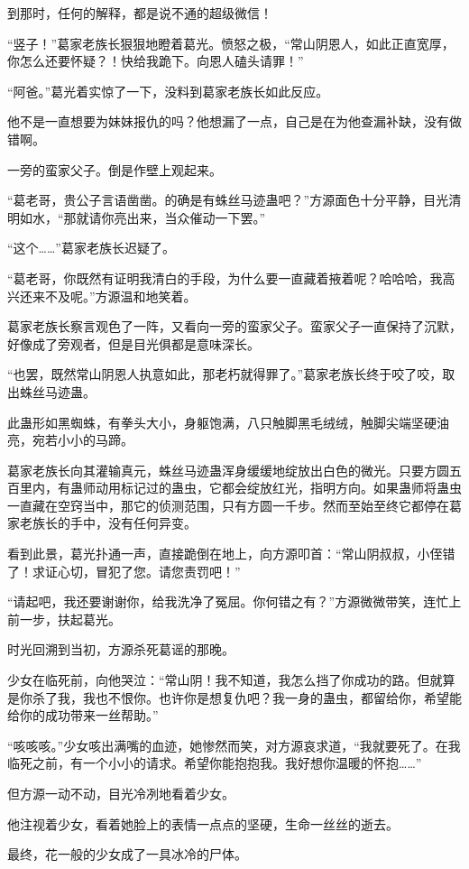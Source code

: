 \begin{this_body}
到那时，任何的解释，都是说不通的超级微信！

“竖子！”葛家老族长狠狠地瞪着葛光。愤怒之极，“常山阴恩人，如此正直宽厚，你怎么还要怀疑？！快给我跪下。向恩人磕头请罪！”

“阿爸。”葛光着实惊了一下，没料到葛家老族长如此反应。

他不是一直想要为妹妹报仇的吗？他想漏了一点，自己是在为他查漏补缺，没有做错啊。

一旁的蛮家父子。倒是作壁上观起来。

“葛老哥，贵公子言语凿凿。的确是有蛛丝马迹蛊吧？”方源面色十分平静，目光清明如水，“那就请你亮出来，当众催动一下罢。”

“这个……”葛家老族长迟疑了。

“葛老哥，你既然有证明我清白的手段，为什么要一直藏着掖着呢？哈哈哈，我高兴还来不及呢。”方源温和地笑着。

葛家老族长察言观色了一阵，又看向一旁的蛮家父子。蛮家父子一直保持了沉默，好像成了旁观者，但是目光俱都是意味深长。

“也罢，既然常山阴恩人执意如此，那老朽就得罪了。”葛家老族长终于咬了咬，取出蛛丝马迹蛊。

此蛊形如黑蜘蛛，有拳头大小，身躯饱满，八只触脚黑毛绒绒，触脚尖端坚硬油亮，宛若小小的马蹄。

葛家老族长向其灌输真元，蛛丝马迹蛊浑身缓缓地绽放出白色的微光。只要方圆五百里内，有蛊师动用标记过的蛊虫，它都会绽放红光，指明方向。如果蛊师将蛊虫一直藏在空窍当中，那它的侦测范围，只有方圆一千步。然而至始至终它都停在葛家老族长的手中，没有任何异变。

看到此景，葛光扑通一声，直接跪倒在地上，向方源叩首：“常山阴叔叔，小侄错了！求证心切，冒犯了您。请您责罚吧！”

“请起吧，我还要谢谢你，给我洗净了冤屈。你何错之有？”方源微微带笑，连忙上前一步，扶起葛光。

时光回溯到当初，方源杀死葛谣的那晚。

少女在临死前，向他哭泣：“常山阴！我不知道，我怎么挡了你成功的路。但就算是你杀了我，我也不恨你。也许你是想复仇吧？我一身的蛊虫，都留给你，希望能给你的成功带来一丝帮助。”

“咳咳咳。”少女咳出满嘴的血迹，她惨然而笑，对方源哀求道，“我就要死了。在我临死之前，有一个小小的请求。希望你能抱抱我。我好想你温暖的怀抱……”

但方源一动不动，目光冷冽地看着少女。

他注视着少女，看着她脸上的表情一点点的坚硬，生命一丝丝的逝去。

最终，花一般的少女成了一具冰冷的尸体。


\end{this_body}
